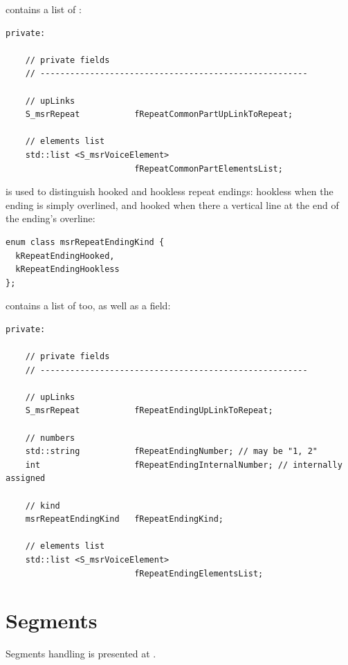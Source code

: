  contains a list of :
\begin{lstlisting}[language=CPlusPlus]
  private:

    // private fields
    // ------------------------------------------------------

    // upLinks
    S_msrRepeat           fRepeatCommonPartUpLinkToRepeat;

    // elements list
    std::list <S_msrVoiceElement>
                          fRepeatCommonPartElementsList;
\end{lstlisting}

 is used to distinguish hooked and hookless repeat endings: hookless when the ending is simply overlined, and hooked when there a vertical line at the end of the ending's overline:
\begin{lstlisting}[language=CPlusPlus]
enum class msrRepeatEndingKind {
  kRepeatEndingHooked,
  kRepeatEndingHookless
};
\end{lstlisting}

 contains a list of  too, as well as a  field:
\begin{lstlisting}[language=CPlusPlus]
  private:

    // private fields
    // ------------------------------------------------------

    // upLinks
    S_msrRepeat           fRepeatEndingUpLinkToRepeat;

    // numbers
    std::string           fRepeatEndingNumber; // may be "1, 2"
    int                   fRepeatEndingInternalNumber; // internally assigned

    // kind
    msrRepeatEndingKind   fRepeatEndingKind;

    // elements list
    std::list <S_msrVoiceElement>
                          fRepeatEndingElementsList;
\end{lstlisting}


\section{Segments}\label{Segments}

Segments handling is presented at .

